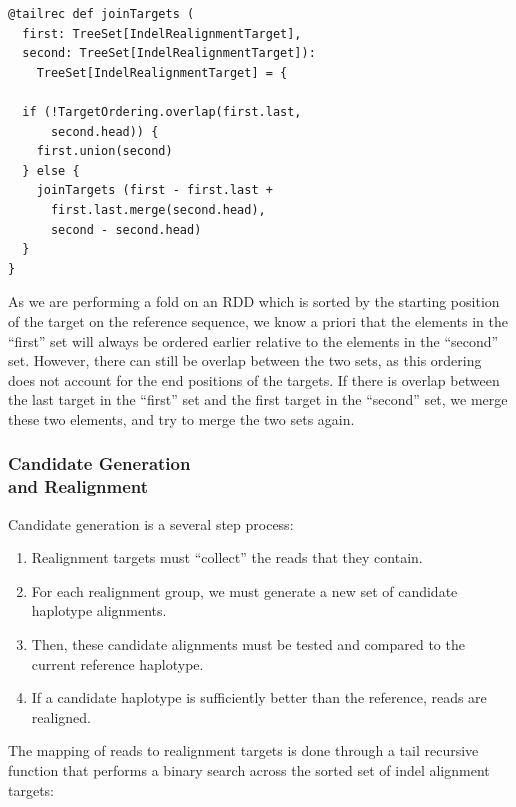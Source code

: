 \documentclass[10pt,twocolumn]{article}
\theoremstyle{plain}
\begin{document}
\begin{lstlisting}
@tailrec def joinTargets (                                                                                                                                                               
  first: TreeSet[IndelRealignmentTarget],                                                                                                                                                                
  second: TreeSet[IndelRealignmentTarget]):
    TreeSet[IndelRealignmentTarget] = {

  if (!TargetOrdering.overlap(first.last,
      second.head)) {
    first.union(second)
  } else {
    joinTargets (first - first.last +
      first.last.merge(second.head),
      second - second.head)
  }
}
\end{lstlisting}

As we are performing a fold on an RDD which is sorted by the starting position of the target on the reference sequence, we know a priori that the elements
in the ``first'' set will always be ordered earlier relative to the elements in the ``second'' set. However, there can still be overlap between the two sets, as this
ordering does not account for the end positions of the targets. If there is overlap between the last target in the ``first'' set and the first target in the ``second''
set, we merge these two elements, and try to merge the two sets again.

\subsubsection{Candidate Generation\\and Realignment}
\label{sec:candidate-generation-realignment}

Candidate generation is a several step process:

\begin{enumerate}
\item Realignment targets must ``collect'' the reads that they contain.
\item For each realignment group, we must generate a new set of candidate haplotype alignments.
\item Then, these candidate alignments must be tested and compared to the current reference haplotype.
\item If a candidate haplotype is sufficiently better than the reference, reads are realigned.
\end{enumerate}

The mapping of reads to realignment targets is done through a tail recursive function that performs a binary search across the sorted set of indel alignment targets:
\end{document}
